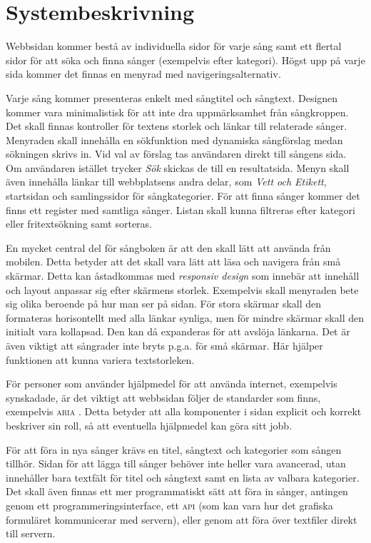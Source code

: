 \section{Systembeskrivning}

Webbsidan kommer bestå av individuella sidor för varje sång samt ett flertal sidor för att söka och finna sånger (exempelvis efter kategori). Högst upp på varje sida kommer det finnas en menyrad med navigeringsalternativ.

Varje sång kommer presenteras enkelt med sångtitel och sångtext. Designen kommer vara minimalistisk för att inte dra uppmärksamhet från sångkroppen. Det skall finnas kontroller för textens storlek och länkar till relaterade sånger. Menyraden skall innehålla en sökfunktion med dynamiska sångförslag medan sökningen skrivs in. Vid val av förslag tas användaren direkt till sångens sida. Om användaren istället trycker \emph{Sök} skickas de till en resultatsida. Menyn skall även innehålla länkar till webbplatsens andra delar, som \emph{Vett och Etikett}, startsidan och samlingssidor för sångkategorier. För att finna sånger kommer det finns ett register med samtliga sånger. Listan skall kunna filtreras efter kategori eller fritextsökning samt sorteras.

En mycket central del för sångboken är att den skall lätt att använda från mobilen. Detta betyder att det skall vara lätt att läsa och navigera från små skärmar. Detta kan åstadkommas med \emph{responsiv design} som innebär att innehåll och layout anpassar sig efter skärmens storlek. Exempelvis skall menyraden bete sig olika beroende på hur man ser på sidan. För stora skärmar skall den formateras horisontellt med alla länkar synliga, men för mindre skärmar skall den initialt vara kollapsad. Den kan då expanderas för att avslöja länkarna. Det är även viktigt att sångrader inte bryts p.g.a. för små skärmar. Här hjälper funktionen att kunna variera textstorleken.

För personer som använder hjälpmedel för att använda internet, exempelvis synskadade, är det viktigt att webbsidan följer de standarder som finns, exempelvis \textsc{aria} \cite{aria}. Detta betyder att alla komponenter i sidan explicit och korrekt beskriver sin roll, så att eventuella hjälpmedel kan göra sitt jobb.

För att föra in nya sånger krävs en titel, sångtext och kategorier som sången tillhör. Sidan för att lägga till sånger behöver inte heller vara avancerad, utan innehåller bara textfält för titel och sångtext samt en lista av valbara kategorier. Det skall även finnas ett mer programmatiskt sätt att föra in sånger, antingen genom ett programmeringsinterface, ett \textsc{api} (som kan vara hur det grafiska formuläret kommunicerar med servern), eller genom att föra över textfiler direkt till servern.